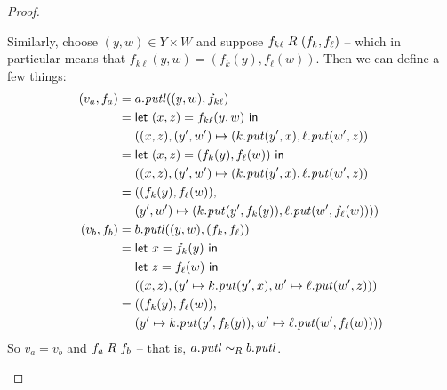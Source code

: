 \begin{defn}[$R$-similarity]
\begin{theorem}
\begin{lemma}
\begin{theorem}[No products]
\begin{lemma}
\begin{defn}
\begin{theorem}
\begin{corollary}[Hylomorphism]
\begin{defn}
\begin{defn}[Symmetrization]
\begin{proof}
\begin{longenum}
Similarly, choose $(y,w) \in Y \times W$ and suppose $f_{k\ell} \mathrel{R_{}}
(f_k,f_\ell)$ -- which in particular means that
$f_{k\ell}(y,w)=(f_k(y),f_\ell(w))$. Then we can define a few things:
\begin{align*}
    (v_a,f_a) ={}
    & a.\mathit{putl}((y,w),f_{k\ell}) \\
    ={}
    & \mathsf{let}\  (x,z) = f_{k\ell}(y,w) \ \mathsf{in} \\
    & ((x,z), (y',w') \mapsto (k.\mathit{put}(y',x),\ell.\mathit{put}(w',z)) \\
    ={}
    & \mathsf{let}\  (x,z) = (f_k(y),f_\ell(w)) \ \mathsf{in} \\
    & ((x,z), (y',w') \mapsto (k.\mathit{put}(y',x),\ell.\mathit{put}(w',z)) \\
    ={}
    & ((f_k(y),f_\ell(w)), \\
    & (y',w') \mapsto (k.\mathit{put}(y',f_k(y)),\ell.\mathit{put}(w',f_\ell(w)))) \\
    (v_b,f_b) ={}
    & b.\mathit{putl}((y,w),(f_k,f_\ell)) \\
    ={}
    & \mathsf{let}\  x = f_k(y) \ \mathsf{in} \\
    & \mathsf{let}\  z = f_\ell(w) \ \mathsf{in} \\
    & ((x,z),(y' \mapsto k.\mathit{put}(y',x),w' \mapsto \ell.\mathit{put}(w',z))) \\
    ={}
    & ((f_k(y),f_\ell(w)), \\
    & (y' \mapsto k.\mathit{put}(y',f_k(y)),w' \mapsto \ell.\mathit{put}(w',f_\ell(w))))
\end{align*}
So $v_a=v_b$ and $f_a \mathrel{R_{}} f_b$ -- that is, $a.\mathit{putl} \sim_R b.\mathit{putl}$.


\end{longenum}
\end{proof}
\end{defn}
\end{defn}
\end{corollary}
\end{theorem}
\end{defn}
\end{lemma}
\end{theorem}
\end{lemma}
\end{theorem}
\end{defn}
